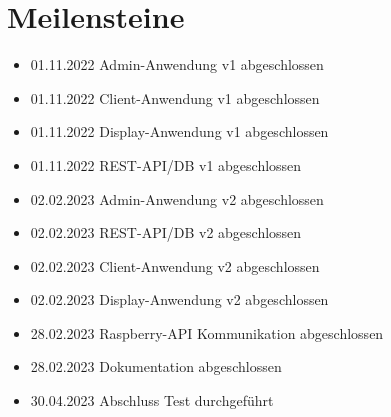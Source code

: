 
\newpage

\section{Meilensteine}
\begin{itemize}
    \item 01.11.2022 Admin-Anwendung v1 abgeschlossen
    \item 01.11.2022 Client-Anwendung v1 abgeschlossen
    \item 01.11.2022 Display-Anwendung v1 abgeschlossen
    \item 01.11.2022 REST-API/DB v1 abgeschlossen
    
    \item 02.02.2023 Admin-Anwendung v2 abgeschlossen
    \item 02.02.2023 REST-API/DB v2 abgeschlossen
    \item 02.02.2023 Client-Anwendung v2 abgeschlossen
    \item 02.02.2023 Display-Anwendung v2 abgeschlossen

    \item 28.02.2023 Raspberry-API Kommunikation abgeschlossen
    \item 28.02.2023 Dokumentation abgeschlossen
    \item 30.04.2023 Abschluss Test durchgeführt 
\end{itemize}